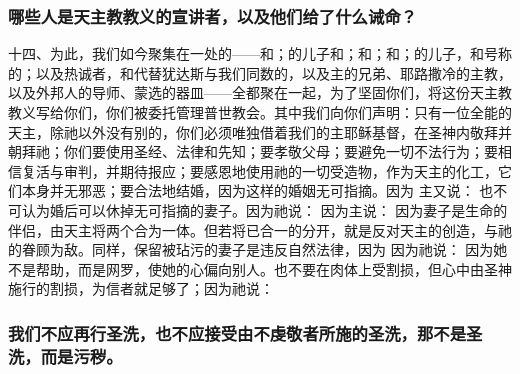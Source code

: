 
\subsubsection{哪些人是天主教教义的宣讲者，以及他们给了什么诫命？}

十四、为此，我们如今聚集在一处的——和；的儿子和；和；和；的儿子，和号称的；以及热诚者，和代替犹达斯与我们同数的，以及主的兄弟、耶路撒冷的主教，以及外邦人的导师、蒙选的器皿——全都聚在一起，为了坚固你们，将这份天主教教义写给你们，你们被委托管理普世教会。其中我们向你们声明：只有一位全能的天主，除祂以外没有别的，你们必须唯独借着我们的主耶稣基督，在圣神内敬拜并朝拜祂；你们要使用圣经、法律和先知；要孝敬父母；要避免一切不法行为；要相信复活与审判，并期待报应；要感恩地使用祂的一切受造物，作为天主的化工，它们本身并无邪恶；要合法地结婚，因为这样的婚姻无可指摘。因为 主又说： 也不可认为婚后可以休掉无可指摘的妻子。因为祂说： 因为主说： 因为妻子是生命的伴侣，由天主将两个合为一体。但若将已合一的分开，就是反对天主的创造，与祂的眷顾为敌。同样，保留被玷污的妻子是违反自然法律，因为 因为祂说： 因为她不是帮助，而是网罗，使她的心偏向别人。也不要在肉体上受割损，但心中由圣神施行的割损，为信者就足够了；因为祂说：\par


\subsubsection{我们不应再行圣洗，也不应接受由不虔敬者所施的圣洗，那不是圣洗，而是污秽。}

